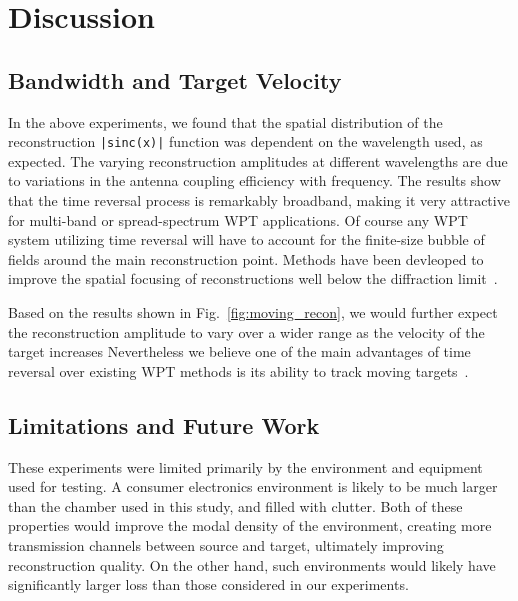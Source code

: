 \section{Discussion}

\subsection{Bandwidth and Target Velocity}
\label{sec:bandwidth}


In the above experiments, we found that the spatial distribution of the
reconstruction \texttt{|sinc(x)|} function was dependent on the wavelength used,
as expected.
%
The varying reconstruction amplitudes at different wavelengths are due to
variations in the antenna coupling efficiency with frequency.
%
The results show that the time reversal process is remarkably broadband, making
it very attractive for multi-band or spread-spectrum WPT applications.
%
Of course any WPT system utilizing time reversal will have to account for the
finite-size bubble of fields around the main reconstruction point.
%
Methods have been devleoped to improve the spatial focusing of reconstructions
well below the diffraction limit~\cite{lerosey-focusing}.



Based on the results shown in Fig.~\ref{fig:moving_recon}, we would further
expect the reconstruction amplitude to vary over a wider range as the velocity
of the target increases
%
Nevertheless we believe one of the main advantages of time reversal over
existing WPT methods is its ability to track moving
targets~\cite{fink,nltr-wave-chaotic}.

\subsection{Limitations and Future Work}
\label{sec:limitations}


These experiments were limited primarily by the environment and equipment used
for testing.
%
A consumer electronics environment is likely to be much larger than the chamber
used in this study, and filled with clutter.
%
Both of these properties would improve the modal density of the environment,
creating more transmission channels between source and target, ultimately
improving reconstruction quality.
%
On the other hand, such environments would likely have significantly larger loss
than those considered in our experiments.



